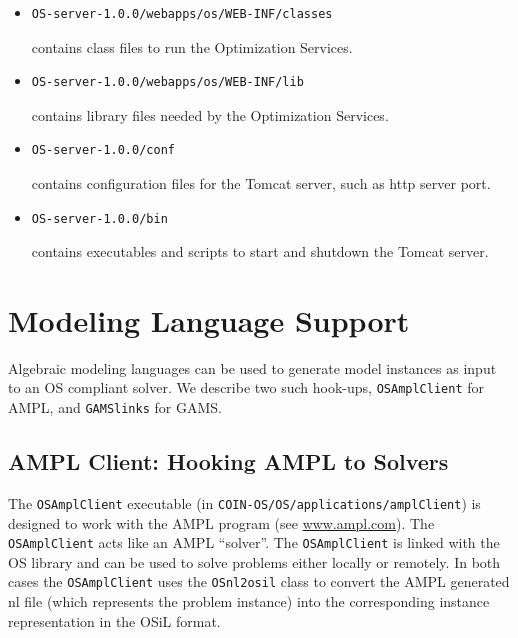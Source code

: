 \documentclass[11pt]{article}
\renewcommand{\_}{{\char"5F}}
\renewcommand{\{}{{\char"7B}}
\renewcommand{\}}{{\char"7D}}
\renewcommand{\^}{{\char"0D}}
\renewcommand{\'}{{\char"0D}}
\begin{document}
\begin{enumerate}[Step 1:]
\begin{itemize}
\item
\begin{verbatim}
OS-server-1.0.0/webapps/os/WEB-INF/classes
\end{verbatim}
contains class files to run the Optimization Services.
\item
\begin{verbatim}
OS-server-1.0.0/webapps/os/WEB-INF/lib
\end{verbatim}
contains library files needed by the Optimization Services.
\item
\begin{verbatim}
OS-server-1.0.0/conf
\end{verbatim}
contains configuration files for the Tomcat server, such as http server port.
\item
\begin{verbatim}
OS-server-1.0.0/bin
\end{verbatim}
contains executables and scripts to start and shutdown the Tomcat server.
\end{itemize}




\section{Modeling Language Support}\label{section:modellang}

Algebraic modeling languages can be used to generate model instances as input to an OS compliant solver.
We describe two such hook-ups, {\tt OSAmplClient} for AMPL, and {\tt GAMSlinks} for GAMS.


\subsection{AMPL Client:  Hooking AMPL to Solvers}\label{section:amplclient}

The {\tt OSAmplClient} executable (in {\tt COIN-OS/OS/applications/amplClient}) is designed to work with the AMPL program
(see \url{www.ampl.com}). The {\tt OSAmplClient} acts like an AMPL ``solver''. The {\tt OSAmplClient} is linked with the
OS library and can be used to solve problems either locally or remotely. In both cases the {\tt OSAmplClient} uses the
{\tt OSnl2osil} class to convert the AMPL generated nl file
(which represents the problem instance) into the corresponding instance representation in the OSiL format.


\end{enumerate}
\end{document}
